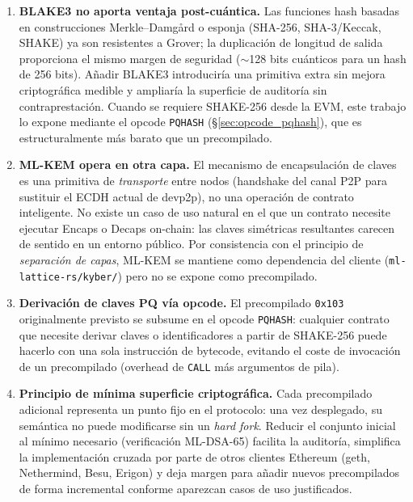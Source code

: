 \begin{enumerate}
  \item \textbf{BLAKE3 no aporta ventaja post-cuántica.} Las funciones hash basadas en construcciones Merkle--Damgård o esponja (SHA-256, SHA-3/Keccak, SHAKE) ya son resistentes a Grover; la duplicación de longitud de salida proporciona el mismo margen de seguridad ($\sim$128 bits cuánticos para un hash de 256 bits). Añadir BLAKE3 introduciría una primitiva extra sin mejora criptográfica medible y ampliaría la superficie de auditoría sin contraprestación. Cuando se requiere SHAKE-256 desde la EVM, este trabajo lo expone mediante el opcode \texttt{PQHASH} (\S\ref{sec:opcode_pqhash}), que es estructuralmente más barato que un precompilado.

  \item \textbf{ML-KEM opera en otra capa.} El mecanismo de encapsulación de claves es una primitiva de \emph{transporte} entre nodos (handshake del canal P2P para sustituir el ECDH actual de devp2p), no una operación de contrato inteligente. No existe un caso de uso natural en el que un contrato necesite ejecutar \textsf{Encaps} o \textsf{Decaps} on-chain: las claves simétricas resultantes carecen de sentido en un entorno público. Por consistencia con el principio de \emph{separación de capas}, ML-KEM se mantiene como dependencia del cliente (\texttt{ml-lattice-rs/kyber/}) pero no se expone como precompilado.

  \item \textbf{Derivación de claves PQ vía opcode.} El precompilado \texttt{0x103} originalmente previsto se subsume en el opcode \texttt{PQHASH}: cualquier contrato que necesite derivar claves o identificadores a partir de SHAKE-256 puede hacerlo con una sola instrucción de bytecode, evitando el coste de invocación de un precompilado (overhead de \texttt{CALL} más argumentos de pila).

  \item \textbf{Principio de mínima superficie criptográfica.} Cada precompilado adicional representa un punto fijo en el protocolo: una vez desplegado, su semántica no puede modificarse sin un \emph{hard fork}. Reducir el conjunto inicial al mínimo necesario (verificación ML-DSA-65) facilita la auditoría, simplifica la implementación cruzada por parte de otros clientes Ethereum (geth, Nethermind, Besu, Erigon) y deja margen para añadir nuevos precompilados de forma incremental conforme aparezcan casos de uso justificados.
\end{enumerate}

